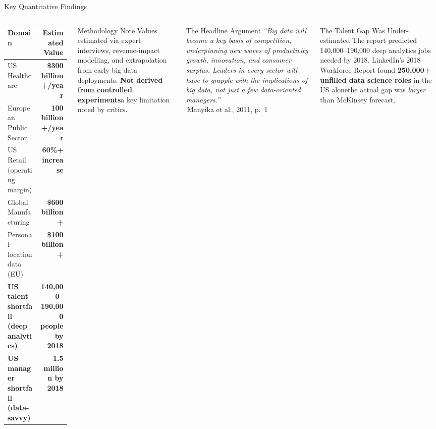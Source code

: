 \documentclass[aspectratio=169,10pt]{beamer}
\begin{document}
\begin{frame}{Key Quantitative Findings}
  \begin{columns}[T]
      \centering
      \renewcommand{\arraystretch}{1.5}
      \begin{tabular}{p{3.6cm}r}
        \toprule
        \textbf{Domain} & \textbf{Estimated Value} \\
        \midrule
        US Healthcare & \alert{\textbf{\$300 billion+/year}} \\
        European Public Sector & \textbf{\texteuro{}100 billion+/year} \\
        US Retail (operating margin) & \textbf{60\%+ increase} \\
        Global Manufacturing & \textbf{\$600 billion+} \\
        Personal location data (EU) & \textbf{\$100 billion+} \\
        \midrule
        \textbf{US talent shortfall (deep analytics)} & \textbf{140{,}000--190{,}000 people by 2018} \\
        \textbf{US manager shortfall (data-savvy)} & \textbf{1.5 million by 2018} \\
        \bottomrule
      \end{tabular}
      \vspace{8pt}
      \begin{block}{Methodology Note}
        Values estimated via expert interviews, revenue-impact modelling, and extrapolation from early big data deployments.  \textbf{Not derived from controlled experiments}\textemdash a key limitation noted by critics.
      \end{block}

      \begin{alertblock}{The Headline Argument}
        \textit{``Big data will become a key basis of competition, underpinning new waves of productivity growth, innovation, and consumer surplus.  Leaders in every sector will have to grapple with the implications of big data, not just a few data-oriented managers.''}\\
        \hfill\textemdash\,Manyika et al., 2011, p.\ 1
      \end{alertblock}
      \vspace{6pt}
      \begin{exampleblock}{The Talent Gap Was Under-estimated}
        \small The report predicted 140{,}000--190{,}000 deep analytics jobs needed by 2018.  LinkedIn's 2018 Workforce Report found \textbf{250{,}000+ unfilled data science roles} in the US alone\textemdash the actual gap was \emph{larger} than McKinsey forecast.
      \end{exampleblock}
  \end{columns}
\end{frame}
\end{document}
